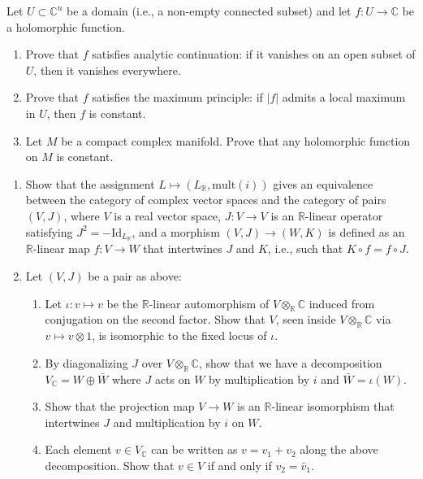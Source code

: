 \documentclass[12pt]{article}
\begin{document}




\begin{problab}{1}
    Let $U \subset \mathbb{C}^n$ be a domain (i.e., a non-empty connected subset) and let $f : U \to \mathbb{C}$ be a holomorphic function.
    \begin{enumerate}
        \item Prove that $f$ satisfies analytic continuation: if it vanishes on an open subset of $U$, then it vanishes everywhere.
        \item Prove that $f$ satisfies the maximum principle: if $|f|$ admits a local maximum in $U$, then $f$ is constant.
        \item Let $M$ be a compact complex manifold. Prove that any holomorphic function on $M$ is constant.
    \end{enumerate}    
\end{problab}
\newpage


\begin{problab}{2}
    \begin{enumerate}
        \item Show that the assignment $L \mapsto (L_{\mathbb{R}}, \text{mult}(i))$ gives an equivalence between the category of complex vector spaces and the category of pairs $(V, J)$, where $V$ is a real vector space, $J : V \to V$ is an $\mathbb{R}$-linear operator satisfying $J^2 = -\mathrm{Id}_{L_\mathbb{R}}$, and a morphism $(V, J) \to (W, K)$ is defined as an $\mathbb{R}$-linear map $f : V \to W$ that intertwines $J$ and $K$, i.e., such that $K \circ f = f \circ J$.

        \item Let $(V, J)$ be a pair as above:
        \begin{enumerate}
            \item Let $\iota : v \mapsto v$ be the $\mathbb{R}$-linear automorphism of $V \otimes_{\mathbb{R}} \mathbb{C}$ induced from conjugation on the second factor. Show that $V$, seen inside $V \otimes_{\mathbb{R}} \mathbb{C}$ via $v \mapsto v \otimes 1$, is isomorphic to the fixed locus of $\iota$.
            \item By diagonalizing $J$ over $V \otimes_{\mathbb{R}} \mathbb{C}$, show that we have a decomposition $V_{\mathbb{C}} = W \oplus \bar{W}$ where $J$ acts on $W$ by multiplication by $i$ and $\bar{W} = \iota(W)$.
            \item Show that the projection map $V \to W$ is an $\mathbb{R}$-linear isomorphism that intertwines $J$ and multiplication by $i$ on $W$.
            \item Each element $v \in V_{\mathbb{C}}$ can be written as $v = v_1 + v_2$ along the above decomposition. Show that $v \in V$ if and only if $v_2 = \bar{v}_1$.
        \end{enumerate}
    \end{enumerate}
\end{problab}
\newpage
\end{document}
